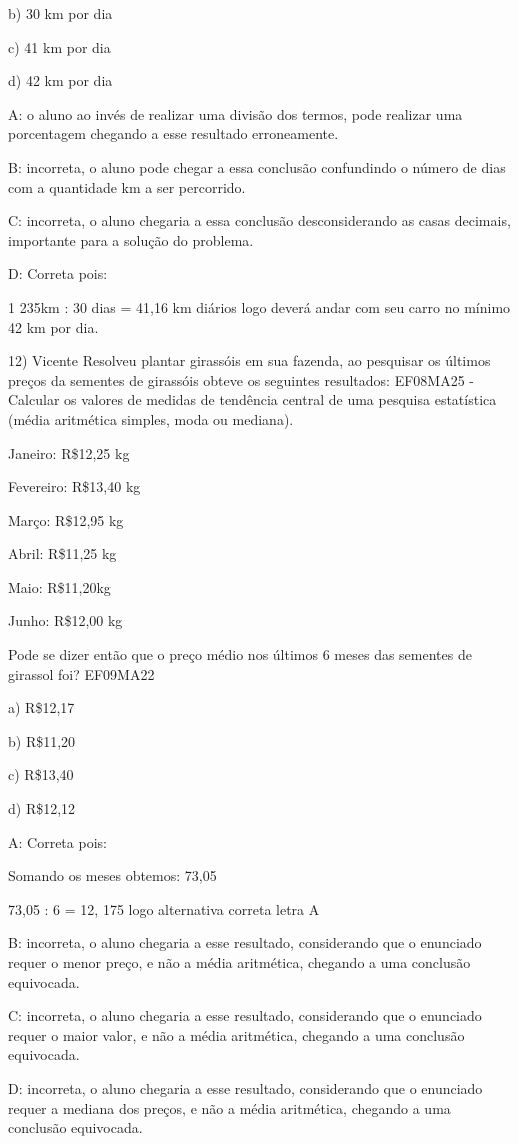 {b) 30 km por dia

c) 41 km por dia

d) 42 km por dia

A: o aluno ao invés de realizar uma divisão dos termos, pode realizar
uma porcentagem chegando a esse resultado erroneamente.

B: incorreta, o aluno pode chegar a essa conclusão confundindo o número
de dias com a quantidade km a ser percorrido.

C: incorreta, o aluno chegaria a essa conclusão desconsiderando as casas
decimais, importante para a solução do problema.

D: Correta pois:

1 235km : 30 dias = 41,16 km diários logo deverá andar com seu carro no
mínimo 42 km por dia.

12) Vicente Resolveu plantar girassóis em sua fazenda, ao pesquisar os
últimos preços da sementes de girassóis obteve os seguintes resultados:
EF08MA25 - Calcular os valores de medidas de tendência central de uma
pesquisa estatística (média aritmética simples, moda ou mediana).

Janeiro: R\$12,25 kg

Fevereiro: R\$13,40 kg

Março: R\$12,95 kg

Abril: R\$11,25 kg

Maio: R\$11,20kg

Junho: R\$12,00 kg

Pode se dizer então que o preço médio nos últimos 6 meses das sementes
de girassol foi? EF09MA22

a) R\$12,17

b) R\$11,20

c) R\$13,40

d) R\$12,12

A: Correta pois:

Somando os meses obtemos: 73,05

73,05 : 6 = 12, 175 logo alternativa correta letra A

B: incorreta, o aluno chegaria a esse resultado, considerando que o
enunciado requer o menor preço, e não a média aritmética, chegando a uma
conclusão equivocada.

C: incorreta, o aluno chegaria a esse resultado, considerando que o
enunciado requer o maior valor, e não a média aritmética, chegando a uma
conclusão equivocada.

D: incorreta, o aluno chegaria a esse resultado, considerando que o
enunciado requer a mediana dos preços, e não a média aritmética,
chegando a uma conclusão equivocada.

}
